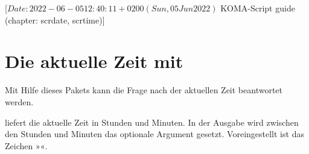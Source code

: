 %
%
%
%
%
%
%

                 [$Date: 2022-06-05 12:40:11 +0200 (Sun, 05 Jun 2022) $
                  KOMA-Script guide (chapter: scrdate, scrtime)]

\chapter{Die aktuelle Zeit mit }
\BeginIndexGroup
{}

Mit Hilfe dieses Pakets kann die Frage nach der aktuellen Zeit beantwortet
werden.%
\iffalse %
\ Seit Version~3.05 unterstützt das Paket auch die von den
\KOMAScript-Klassen und diversen anderen \KOMAScript-Paketen bekannten
Möglichkeiten zur Angabe von Optionen. Siehe dazu beispielsweise
\autoref{sec:typearea.options}.%
\fi

\begin{Declaration}%
\end{Declaration}%
 liefert die aktuelle Zeit in Stunden und
Minuten. In der Ausgabe wird zwischen den Stunden und Minuten das optionale
Argument  gesetzt. Voreingestellt ist das Zeichen
»\PValue{:}«.


